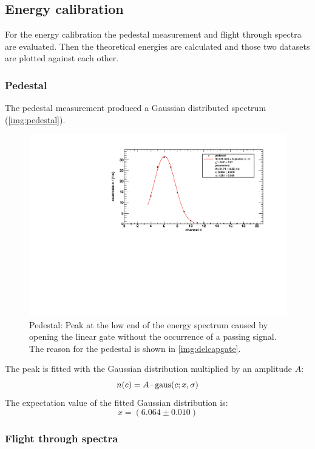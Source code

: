 \subsection{Energy calibration}
For the energy calibration the pedestal measurement and flight through spectra are evaluated. Then the theoretical energies are calculated 
and those two datasets are plotted against each other.
\subsubsection{Pedestal}
The pedestal measurement produced a Gaussian distributed spectrum (\autoref{img:pedestal}).
\begin{figure}[H]
\begin{center}
  \includegraphics[width=\textwidth]{../img/pedestal.pdf}
  \caption{Pedestal: Peak at the low end of the energy spectrum caused by opening the linear gate without the occurrence of a passing signal. 
  The reason for the pedestal is shown in \autoref{img:delcapgate}.}
  \label{img:pedestal}
\end{center}
\end{figure}
The peak is fitted with the Gaussian distribution multiplied by an amplitude $A$:
\begin{equation}
    n(c) = A \cdot \operatorname{gaus}(c;x,\sigma)
\end{equation}
The expectation value of the fitted Gaussian distribution is:
\begin{equation}
    x = (6.064 \pm 0.010)
\end{equation}

\subsubsection{Flight through spectra}
\label{subsub:flightthroughspectra}
